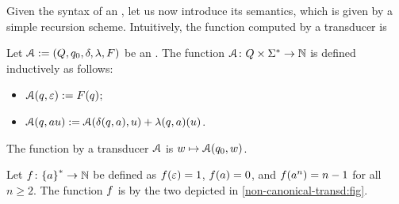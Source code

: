 Given the syntax of an , let us now 
introduce its semantics, which is given by a simple recursion
scheme. Intuitively, the function computed by a transducer is


\begin{definition}
    Let $\mathcal{A} \mathrel{:=} (Q,q_0, \delta, \lambda, F)$ be an .
    The function
    $\mathcal{A} \colon Q \times \Sigma^* \to \mathbb{N}$
    is defined inductively  as follows:
    \begin{itemize}
        \item $\mathcal{A}(q, \varepsilon) \mathrel{:=} F(q)$;
        \item $\mathcal{A}(q, a u) \mathrel{:=} \mathcal{A}(\delta(q,a), u)
            + \lambda(q,a)(u)$.
    \end{itemize}
    The function  by a transducer $\mathcal{A}$
    is $w \mapsto \mathcal{A}(q_0, w)$.
\end{definition}


\begin{example}
    \label{non-canonical-transd:ex}
    Let $\BadExOk \colon \set{a}^* \to \Nat$
    be defined as
    $\BadExOk(\varepsilon) = 1$,
    $\BadExOk(a) = 0$,
    and $\BadExOk(a^n) = n - 1$ for all $n \geq 2$.
    The function $\BadExOk$ is  by the two 
    depicted in \cref{non-canonical-transd:fig}.
\end{example}

